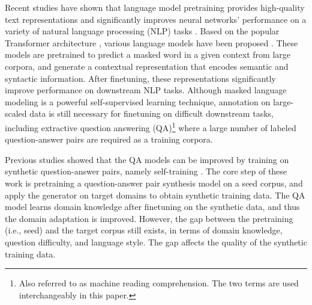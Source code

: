 \documentclass[11pt,a4paper]{article}
\begin{document}
Recent studies have shown that language model pretraining provides high-quality text representations and significantly improves neural networks' performance on a variety of natural language processing (NLP) tasks \cite{peters2018deep}. Based on the popular Transformer architecture \cite{vaswani2017attention}, various language models have been proposed \cite{devlin2018bert,liu2019roberta,clark2019electra}. These models are pretrained to predict a masked word in a given context from large corpora, and generate a contextual representation that encodes semantic and syntactic information. After finetuning, these representations significantly improve performance on downstream NLP tasks. Although masked language modeling is a powerful self-supervised learning technique, annotation on large-scaled data is still necessary for finetuning on difficult downstream tasks, including extractive question answering (QA)\footnote{Also referred to as machine reading comprehension. The two terms are used interchangeably in this paper.} where a large number of labeled question-answer pairs are required as a training corpora.



Previous studies showed that the QA models can be improved by training on synthetic question-answer pairs, namely self-training \cite{sachan2018self,puri2020training,shakeri2020end,bartolo2021improving}. The core step of these work is pretraining a question-answer pair synthesis model on a seed corpus, and apply the generator on target domains to obtain synthetic training data. The QA model learns domain knowledge after finetuning on the synthetic data, and thus the domain adaptation is improved. However, the gap between the pretraining (i.e., seed) and the target corpus still exists, in terms of domain knowledge, question difficulty, and language style. The gap affects the quality of the synthetic training data.
\end{document}
